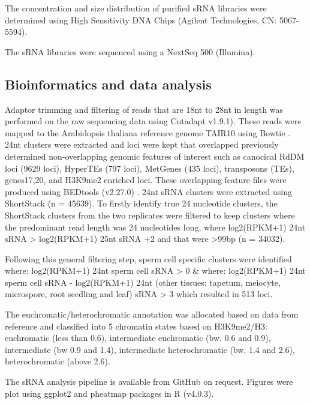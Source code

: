 The concentration and size distribution of purified sRNA libraries were determined using  High Sensitivity DNA Chips (Agilent Technologies, CN: 5067-5594).

The sRNA libraries were sequenced using a NextSeq 500 (Illumina).

\subsection{Bioinformatics and data analysis}

Adaptor trimming and filtering of reads that are 18nt to 28nt in length was performed on the raw sequencing data using Cutadapt \citep{RN88} v1.9.1). These reads were mapped to the Arabidopsis thaliana reference genome TAIR10 using Bowtie \citep{RN89}. 24nt clusters were extracted and loci were kept that overlapped previously determined non-overlapping genomic features of interest such as canocical RdDM loci (9629 loci), HyperTEs (797 loci), MetGenes (435 loci), transposons (TEs), genes17,20, and H3K9me2 enriched loci. These overlapping feature files were produced using BEDtools (v2.27.0) \citep{RN90}. 24nt sRNA clusters were extracted using ShortStack \citep{RN142} (n = 45639). To firstly identify true 24 nucleotide clusters, the ShortStack clusters from the two replicates were filtered to keep clusters where the predominant read length was 24 nucleotides long, where log2(RPKM+1) 24nt sRNA > log2(RPKM+1) 25nt sRNA +2 and that were >99bp (n = 34032).

Following this general filtering step, sperm cell specific clusters were identified where:
log2(RPKM+1) 24nt sperm cell sRNA > 0 \& where:
log2(RPKM+1) 24nt sperm cell sRNA - log2(RPKM+1) 24nt (other tissues: tapetum, meiocyte, microspore, root seedling and leaf) sRNA > 3 which resulted in 513 loci.

The euchromatic/heterochromatic annotation was allocated based on data from reference \cite{RN183} and classified into 5 chromatin states based on H3K9me2/H3: euchromatic (less than 0.6), intermediate euchromatic (bw. 0.6 and 0.9), intermediate (bw 0.9 and 1.4), intermediate heterochromatic (bw. 1.4 and 2.6), heterochromatic (above 2.6). 

The sRNA analysis pipeline is available from GitHub on request. Figures were plot using ggplot2 and pheatmap packages in R (v4.0.3).

